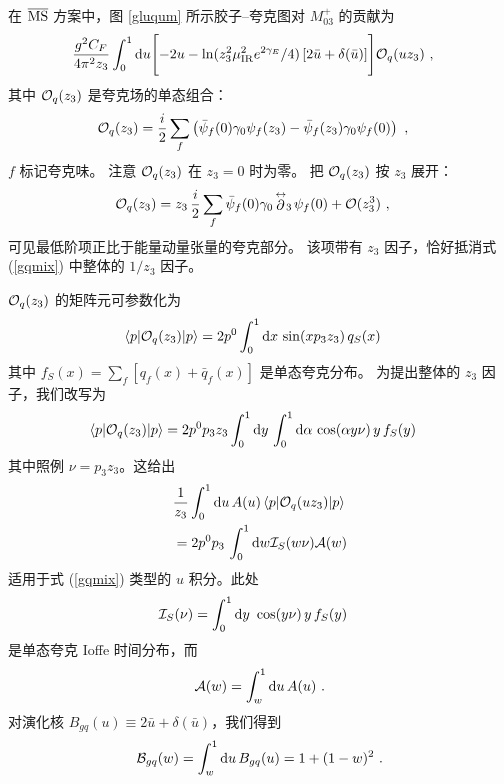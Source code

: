 在 $\overline{\rm MS}$ 方案中，图 \ref{gluqum} 所示胶子--夸克图对 $M_{03} ^+$ 的贡献为
\begin{align}
& \frac{g^2 C_F}{4\pi^2 z_3} \int_0^1 \mathrm{d} u
\Biggl [ -2u - \ln(z_3^2 \mu_{\rm IR}^2 e^{2\gamma_E}/4) \left[2\bar u+\delta(\bar u) \right] \Biggr ] {\cal O}_q (uz_3) \ ,
\label{gqmix}
\end{align}
其中 ${\cal O}_q (z_3)$ 是夸克场的单态组合：
\begin{align}
& {\cal O}_q (z_3)= \frac{i}{2} \sum_f \left(\bar\psi_f( 0) \gamma_0 \psi_f (z_3) - \bar\psi_f( z_3) \gamma_0 \psi_f(0) \right) \ ,
\label{gsing}
\end{align}
$f$ 标记夸克味。
注意 ${\cal O}_q (z_3)$ 在 $z_3=0$ 时为零。
把 ${\cal O}_q (z_3)$ 按 $z_3$
展开：
\begin{align}
& {\cal O}_q ( z_3)= z_3\, \frac{i}{2} \sum_f \bar\psi_f( 0)\gamma_0 \!\stackrel{\leftrightarrow}{\partial}_3\! \psi_f(0) + {\cal O} (z_3^3) \ ,
\label{gsingb}
\end{align}
可见最低阶项正比于能量动量张量的夸克部分。
该项带有 $z_3$ 因子，恰好抵消式 (\ref{gqmix}) 中整体的 $1/z_3$ 因子。

${\cal O}_q ( z_3)$ 的矩阵元可参数化为
\begin{align}
& \langle p| {\cal O}_q ( z_3) |p\rangle = 2 p^0
\int_0^1 \mathrm{d} x \, \sin (x p_3 z_3) \, q_S (x)
\label{qpar}
\end{align}
其中 $f_S (x) = \sum_f [q_f (x) +\bar q_f (x)]$ 是单态夸克分布。
为提出整体的 $z_3$ 因子，我们改写为
\begin{align}
& \langle p| {\cal O}_q ( z_3) |p\rangle
= 2 p^0 p_3 z_3
\int_0^1 \mathrm{d} y \, \int_0^1 \mathrm{d} \alpha\, \cos (\alpha y \nu) \, y \, f_S (y )
\label{qpar2}
\end{align}
其中照例 $\nu = p_3 z_3$。这给出
\begin{align}
&\frac1{z_3} \int_0^1 \mathrm{d} u \, A(u) \, \langle p| {\cal O}_q (u z_3) |p\rangle
\nonumber \\  &
= 2 p^0 p_3 \, \int_0^1 \mathrm{d} w {\cal I}_S (w \nu) {\cal A} (w)
\label{qpar3}
\end{align}
适用于式 (\ref{gqmix}) 类型的 $u$ 积分。此处
\begin{align}
& {\cal I}_S (\nu) =
\int_0^1 \mathrm{d} y \ \cos (y \nu) \, y\, f_S (y)
\label{MS}
\end{align}
是单态夸克 Ioffe 时间分布，而
\begin{align}
{\cal A} (w)=
\int_w^1 \mathrm{d} u \, A(u) \ .
\label{Aw}
\end{align}
对演化核 $B_{gq} (u) \equiv 2\bar u+\delta(\bar u)$，我们得到
\begin{align}
{\cal B}_{gq} (w)=
\int_w^1 \mathrm{d} u \, B_{gq} (u) = 1+ (1- w)^2 \ .
\label{Bw}
\end{align}

